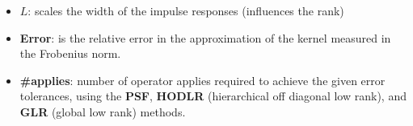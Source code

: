 \documentclass[10pt,final,xcolor=dvipsnames]{beamer}
\begin{document}
\begin{frame}
  \begin{itemize}
  \item {$L$}: scales the width of the impulse responses (influences the rank)
  \item {\bf Error}: is the relative error in the approximation of the
    kernel measured in the Frobenius norm.
  \item {\bf \#applies}: number of operator applies required to achieve
    the given error tolerances, using the {\bf PSF}, {\bf HODLR} (hierarchical
    off diagonal low rank), and {\bf GLR} (global low rank) methods.
  \end{itemize}
  
\end{frame}
%
%
%
\end{document}
